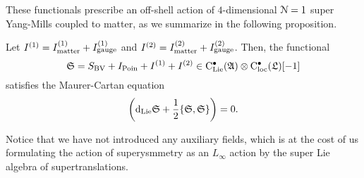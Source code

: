\documentclass[10pt, oneside]{article}
\begin{document}
These functionals prescribe an off-shell action of $4$-dimensional $\mathcal N=1$ super Yang-Mills coupled to matter, as we summarize in the following proposition.


\begin{prop}
Let $I^{(1)} = I^{(1)}_{\rm matter} + I^{(1)}_{\rm gauge}$ and $I^{(2)} = I^{(2)}_{\rm matter} + I^{(2)}_{\rm gauge}$. 
Then, the functional
\[
\mathfrak S = S_{\rm BV} + I_{\rm Poin} + I^{(1)} + I^{(2)} \in {\rm C}_{\rm Lie}^\bullet(\mathfrak{A}) \otimes {\rm C}_{\rm loc}^\bullet(\mathfrak L) [-1]
\]
satisfies the Maurer-Cartan equation
\[
\left({\rm d}_{\rm Lie} \mathfrak S + \frac{1}{2} \{\mathfrak S, \mathfrak S\} \right) = 0 .
\]
\end{prop}

Notice that we have not introduced any auxiliary fields, which is at the cost of us formulating the action of superysmmetry as an $L_\infty$ action by the super Lie algebra of supertranslations. 
\end{document}
